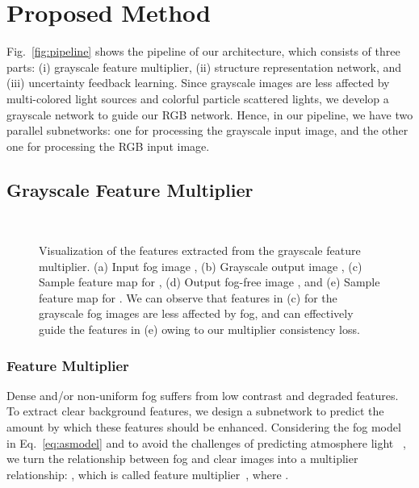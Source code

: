 \documentclass[runningheads]{llncs}
\begin{document}
\section{Proposed Method}\label{sec:proposed}
Fig.~\ref{fig:pipeline} shows the pipeline of our architecture, which consists of three parts: (i) grayscale feature multiplier, (ii)  structure representation network, and (iii) uncertainty feedback learning.
Since grayscale images are less affected by multi-colored light sources and colorful particle scattered lights, we develop a grayscale network to guide our RGB network.
Hence, in our pipeline, we have two parallel subnetworks: one for processing the grayscale input image,  and the other one for processing the RGB input image.

\subsection{Grayscale Feature Multiplier}
\begin{figure}[t]
	\centering
	\hfill
	\hfill
	\hfill
	\hfill
	\hfill\\
	\caption{Visualization of the features extracted from the grayscale feature multiplier.
		(a) Input fog image , 
		(b) Grayscale output image ,
		(c) Sample feature map for , 
		(d) Output fog-free image  , 
		and (e) Sample feature map for  . 
		We can observe that features in (c) for the grayscale fog images are less affected by fog, and can effectively guide the features in (e) owing to our multiplier consistency loss.}
	\label{fig:featureloss}
\end{figure}


\subsubsection{Feature Multiplier}
Dense and/or non-uniform fog suffers from low contrast and degraded features. 
To extract clear background features, we design a subnetwork to predict the amount by which these features should be enhanced.
Considering the fog model in Eq.~\eqref{eq:asmodel} and to avoid the challenges of predicting atmosphere light ~\cite{Sulami2014}, 
we turn the relationship between fog  and clear images  into a multiplier relationship:
, which is called  feature multiplier~\cite{li2019rainflow}, where 
.
\end{document}

